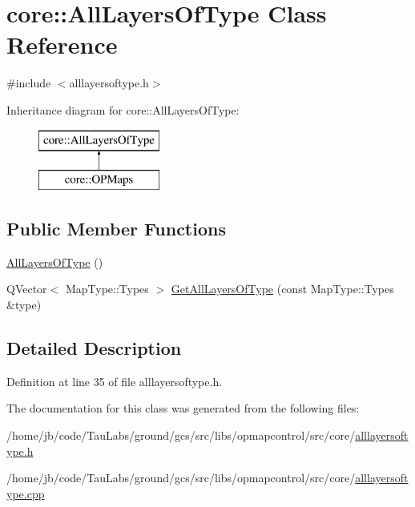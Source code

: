 \hypertarget{classcore_1_1_all_layers_of_type}{\section{core\-:\-:\-All\-Layers\-Of\-Type \-Class \-Reference}
\label{classcore_1_1_all_layers_of_type}
}


{\ttfamily \#include $<$alllayersoftype.\-h$>$}

\-Inheritance diagram for core\-:\-:\-All\-Layers\-Of\-Type\-:\begin{figure}[H]
\begin{center}
\leavevmode
\includegraphics[height=2.000000cm]{classcore_1_1_all_layers_of_type}
\end{center}
\end{figure}
\subsection*{\-Public \-Member \-Functions}
\begin{DoxyCompactItemize}
\item 
\hyperlink{group___o_p_map_widget_gac9c4b0c8a890cbccd4a9c16a57be28c4}{\-All\-Layers\-Of\-Type} ()
\item 
\-Q\-Vector$<$ \-Map\-Type\-::\-Types $>$ \hyperlink{group___o_p_map_widget_gaa620f4fda0c58c2ff2919a2fef795074}{\-Get\-All\-Layers\-Of\-Type} (const \-Map\-Type\-::\-Types \&type)
\end{DoxyCompactItemize}


\subsection{\-Detailed \-Description}


\-Definition at line 35 of file alllayersoftype.\-h.



\-The documentation for this class was generated from the following files\-:\begin{DoxyCompactItemize}
\item 
/home/jb/code/\-Tau\-Labs/ground/gcs/src/libs/opmapcontrol/src/core/\hyperlink{alllayersoftype_8h}{alllayersoftype.\-h}\item 
/home/jb/code/\-Tau\-Labs/ground/gcs/src/libs/opmapcontrol/src/core/\hyperlink{alllayersoftype_8cpp}{alllayersoftype.\-cpp}\end{DoxyCompactItemize}
